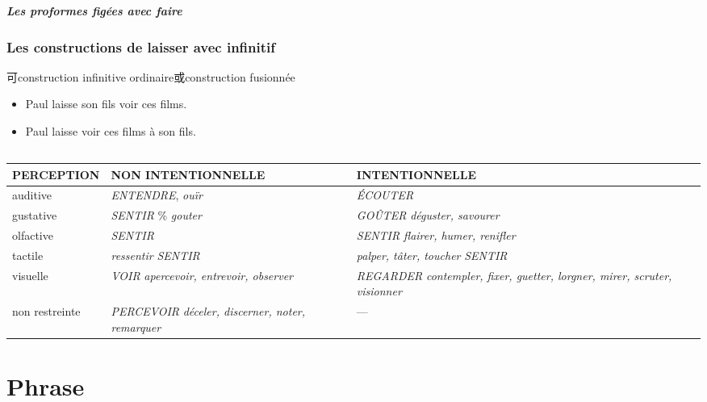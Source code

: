 \documentclass[UTF8]{report}
\begin{document}
\paragraph{Les proformes figées avec faire}


\subsection{Les constructions de laisser avec infinitif}
可construction infinitive ordinaire或construction fusionnée
\begin{itemize}
    \item Paul laisse son fils voir ces films.
    \item Paul laisse voir ces films à son fils.
\end{itemize}


\section{}

\begin{adjustbox}{max width = \textwidth}
    \begin{tabular}{|l|l|l|}
\hline
\textbf{PERCEPTION} & \textbf{NON INTENTIONNELLE} & \textbf{INTENTIONNELLE} \\
\hline
auditive & \textit{ENTENDRE}, \textit{ouïr} & \textit{ÉCOUTER} \\
\hline
gustative & \textit{SENTIR} \% \textit{gouter} &\textit{GOÛTER} \textit{déguster, savourer}  \\
\hline
olfactive & \textit{SENTIR} & \textit{SENTIR}   \textit{flairer, humer, renifler} \\
\hline
tactile & \textit{ressentir}   \textit{SENTIR} & \textit{palper, tâter, toucher}   \textit{SENTIR} \\
\hline
visuelle & \textit{VOIR}   \textit{apercevoir, entrevoir, observer} & \textit{REGARDER}   \textit{contempler, fixer, guetter, lorgner, mirer, scruter, visionner} \\
\hline
non restreinte & \textit{PERCEVOIR}  \textit{déceler, discerner, noter, remarquer} & \quad --- \\
\hline
\end{tabular}

\end{adjustbox}




\chapter{Phrase}
\end{document}
